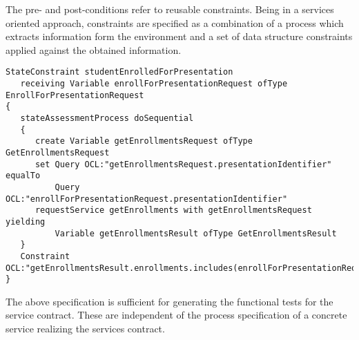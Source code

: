 The pre- and post-conditions refer to reusable constraints. Being in a services oriented approach, constraints are specified as a combination of a process which extracts information form the environment and a set of data structure constraints applied against the obtained information.
\tiny{\begin{verbatim}
StateConstraint studentEnrolledForPresentation 
   receiving Variable enrollForPresentationRequest ofType EnrollForPresentationRequest
{
   stateAssessmentProcess doSequential
   {
      create Variable getEnrollmentsRequest ofType GetEnrollmentsRequest
      set Query OCL:"getEnrollmentsRequest.presentationIdentifier" equalTo
          Query OCL:"enrollForPresentationRequest.presentationIdentifier"
      requestService getEnrollments with getEnrollmentsRequest yielding
          Variable getEnrollmentsResult ofType GetEnrollmentsResult
   }
   Constraint OCL:"getEnrollmentsResult.enrollments.includes(enrollForPresentationRequest.personIdentifier)"
}
\end{verbatim}}
\normalsize
The above specification is sufficient for generating the functional tests for the service contract. These are independent of the process specification of a concrete service realizing the services contract.

